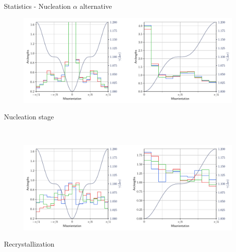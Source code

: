 \documentclass[usenames,dvipsnames]{beamer}
\begin{document}
\begin{frame}{Statistics - Nucleation $\alpha$ alternative}
\small
    \begin{minipage}{\textwidth}
    \centering
    \vspace{-0.5em}
    \begin{figure}
    \centering
    \includegraphics[scale=0.33]{figures/stored_energy/SE/gbcd/000110_nuclalternative_set.pdf}
    \end{figure}
    \vspace{-2em}
    Nucleation stage
    \end{minipage}\\
    \begin{minipage}{\textwidth}
    \centering
    \begin{figure}
    \centering
    \includegraphics[scale=0.33]{figures/stored_energy/SE/gbcd/000240_nuclalternative_set.pdf}
    \end{figure}
    \vspace{-2em}
    Recrystallization
    \end{minipage}
\end{frame}
\end{document}
